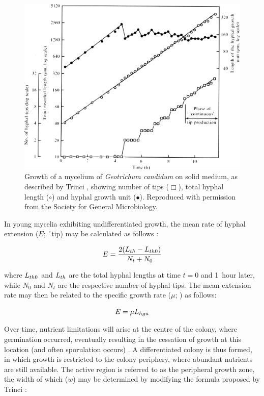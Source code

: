 \begin{figure}[t]
	\centering
	\includegraphics[width=(\textwidth - 1cm)]{../C1/Fig1Trinci1974}
	\caption{Growth of a mycelium of \emph{Geotrichum candidum} on solid medium, as described by Trinci \cite{trinci1974}, showing number of tips ($\Box$), total hyphal length ($\circ$) and hyphal growth unit ($\bullet$). Reproduced with permission from the Society for General Microbiology.}
	\label{fig:Fig1Trinci1974}
\end{figure}

In young mycelia exhibiting undifferentiated growth, the mean rate of hyphal extension ($E$; \h{\omic~tip}) may be calculated as follows \cite{prosser1995}:

\begin{equation}\label{eq:ELN}
	E = \frac{2(L_{th} - L_{th0})}{N_t + N_0}
\end{equation}

\noindent where $L_{th0}$ and $L_{th}$ are the total hyphal lengths at time $t=0$ and 1~hour later, while $N_0$ and $N_t$ are the respective number of hyphal tips. The mean extension rate may then be related to the specific growth rate ($\mu$; \oh) as follows:

\begin{equation}
	E = \mu L_{hgu}
\end{equation}

\noindent Over time, nutrient limitations will arise at the centre of the colony, where germination occurred, eventually resulting in the cessation of growth at this location (and often sporulation occurs) \cite{prosser1995}. A differentiated colony is thus formed, in which growth is restricted to the colony periphery, where abundant nutrients are still available. The active region is referred to as the peripheral growth zone, the width of which ($w$) may be determined by modifying the formula proposed by Trinci \cite{trinci1971}:

